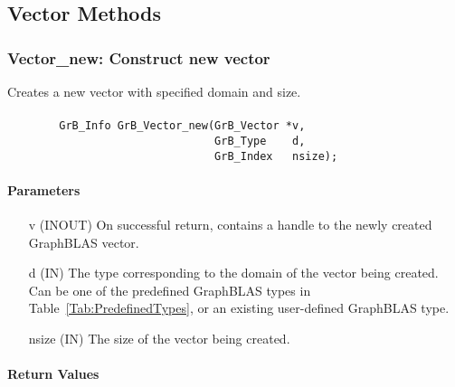 \subsection{Vector Methods}

\subsubsection{{\sf Vector\_new}: Construct new vector}

Creates a new vector with specified domain and size.

\paragraph{\syntax}

\begin{verbatim}
        GrB_Info GrB_Vector_new(GrB_Vector *v,
                                GrB_Type    d,
                                GrB_Index   nsize);
\end{verbatim}

\paragraph{Parameters}

\begin{itemize}[leftmargin=1.1in]
    \item[{\sf v}] ({\sf INOUT}) On successful return, contains a handle
                                 to the newly created GraphBLAS vector.
    \item[{\sf d}] ({\sf IN})    The type corresponding to the domain of the 
                                 vector being created.  Can be one of the 
                                 predefined GraphBLAS types in 
                                 Table~\ref{Tab:PredefinedTypes}, or an existing 
                                 user-defined GraphBLAS type.
    \item[{\sf nsize}] ({\sf IN}) The size of the vector being created.
\end{itemize}

\paragraph{Return Values}

